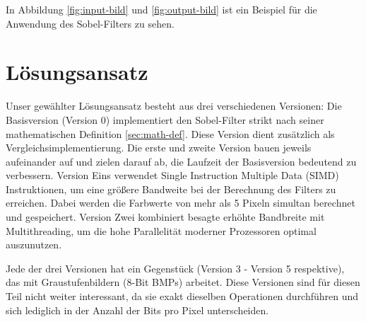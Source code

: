 \documentclass[course=erap]{aspdoc}
\begin{document}
In Abbildung \ref{fig:input-bild} und \ref{fig:output-bild} ist ein Beispiel für die Anwendung des Sobel-Filters zu sehen.

\section{Lösungsansatz}
Unser gewählter Lösungsansatz besteht aus drei verschiedenen Versionen:
Die Basisversion (Version 0) implementiert den Sobel-Filter strikt nach seiner mathematischen Definition \ref{sec:math-def}.
Diese Version dient zusätzlich als Vergleichsimplementierung.
Die erste und zweite Version bauen jeweils aufeinander auf und zielen darauf ab, die Laufzeit der Basisversion bedeutend zu verbessern.
Version Eins verwendet Single Instruction Multiple Data (SIMD) Instruktionen, um eine größere Bandweite bei der Berechnung des Filters zu erreichen.
Dabei werden die Farbwerte von mehr als 5 Pixeln simultan berechnet und gespeichert.
Version Zwei kombiniert besagte erhöhte Bandbreite mit Multithreading, um die hohe Parallelität moderner Prozessoren optimal auszunutzen.

Jede der drei Versionen hat ein Gegenstück (Version 3 - Version 5 respektive), das mit Graustufenbildern (8-Bit BMPs) arbeitet.
Diese Versionen sind für diesen Teil nicht weiter interessant, da sie exakt dieselben Operationen durchführen und sich lediglich in der Anzahl der Bits pro Pixel unterscheiden.
\end{document}
